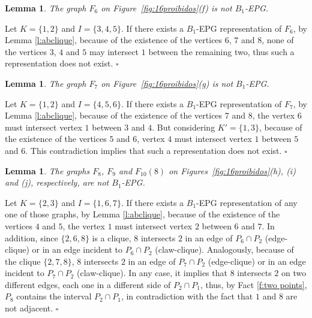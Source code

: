 \documentclass[9pt]{entcs}
\newtheorem{lema}[thm]{Lemma}%
\begin{document}
\begin{pf}
\end{pf}




\begin{lema}\label{lem:F_6}
The graph $F_6$ on Figure~\ref{fig:16proibidos}(f) is not   $B_1$-EPG.
\end{lema}
\begin{pf} Let $K=\{1,2\}$ and $I=\{3,4,5\}$. If there exists a $B_1$-EPG representation of $F_6$,  by Lemma \ref{l:abclique},  because of the existence of the vertices $6$, $7$ and $8$, none of the vertices $3$, $4$ and $5$
may intersect $1$ between the remaining two, thus such a representation does not exist.
 \hfill $\square$\end{pf} 


\begin{lema}\label{lem:F_7}
The graph $F_7$ on Figure~\ref{fig:16proibidos}(g) is not   $B_1$-EPG.
\end{lema}
\begin{pf} Let $K=\{1,2\}$ and $I=\{4,5,6\}$. If there exists a $B_1$-EPG representation of $F_7$,  by Lemma \ref{l:abclique},  because of the existence of the vertices  $7$ and $8$, the vertex $6$ must intersect  vertex $1$ between $3$ and $4$. But considering $K'=\{1,3\}$, because of the existence of the vertices $5$ and $6$,  vertex $4$ must intersect vertex $1$ between $5$ and $6$. This contradiction implies that such a representation does not exist.
 \hfill $\square$\end{pf} 
 
 \begin{lema}\label{lem:F_8_9_10(8)}
The graphs $F_8$, $F_9$ and $F_{10}(8)$ on Figures~\ref{fig:16proibidos}(h), (i) and (j), respectively, are not   $B_1$-EPG.
\end{lema}
\begin{pf} Let $K=\{2,3\}$ and $I=\{1,6,7\}$. If there exists a $B_1$-EPG representation of any one of those graphs,  by Lemma \ref{l:abclique},  because of the existence of the vertices  $4$ and $5$, the vertex $1$ must intersect  vertex $2$ between $6$ and $7$. In addition, since $\{2,6,8\}$ is a clique, $8$ intersects $2$ in an edge of $P_6\cap P_2$ (edge-clique) or in an edge incident to $P_6\cap P_2$ (claw-clique). Analogously, because of the clique $\{2,7,8\}$,  $8$ intersects $2$ in an edge of $P_7\cap P_2$ (edge-clique) or in an edge incident to $P_7\cap P_2$ (claw-clique). In any case, it implies that $8$ intersects $2$ on two different edges, each one in a different side of $P_2 \cap P_1$, thus, by Fact \ref{f:two points}, $P_8$ contains the interval  $P_2 \cap P_1$, in contradiction with the fact that $1$ and $8$ are not adjacent.
 \hfill $\square$\end{pf} 
  
\end{document}
